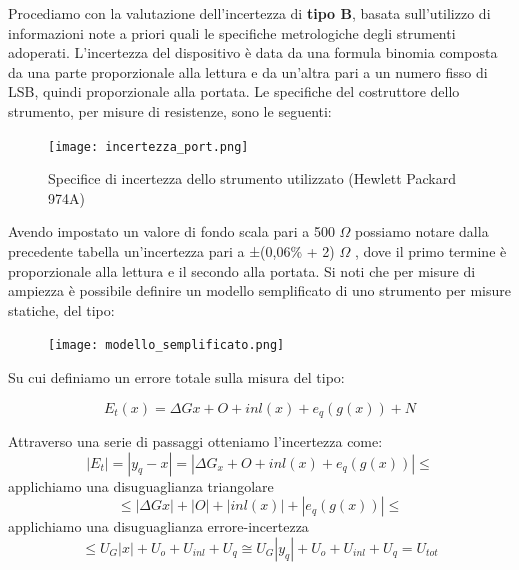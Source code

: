 Procediamo con la valutazione dell'incertezza di \textbf{tipo B}, basata sull'utilizzo di informazioni note a priori quali le specifiche metrologiche degli strumenti adoperati. L’incertezza del dispositivo è data da una formula binomia composta da una parte proporzionale alla lettura e da un’altra pari a un numero fisso di LSB, quindi 
 proporzionale alla portata. Le specifiche del costruttore dello strumento, per misure di resistenze, sono le seguenti:

\begin{figure}[h]
    \centering
    \texttt{[image: incertezza\_port.png]}
    \caption{Specifice di incertezza dello strumento utilizzato (Hewlett Packard 974A)}
    \label{fig:Incertezza_multimetro_port}
\end{figure}
\FloatBarrier

Avendo impostato un valore di fondo scala pari a 500 $\Omega$ possiamo notare dalla precedente tabella un’incertezza pari a ±(0,06\% + 2) $\Omega$ , dove il primo termine è proporzionale alla lettura e il secondo alla portata. Si noti che per misure di ampiezza è possibile definire un modello semplificato di uno strumento per misure statiche, del tipo:

\begin{figure}[h]
    \centering
    \texttt{[image: modello\_semplificato.png]}
    \label{fig:modello}
\end{figure}
\FloatBarrier

Su cui definiamo un errore totale sulla misura del tipo:

\begin{equation}
    E_t(x) = \Delta Gx + O + inl(x) + e_q(g(x)) + N
\end{equation}


Attraverso una serie di passaggi otteniamo l'incertezza come:
\begin{equation}
    |E_t| = |y_q - x| = | \Delta G_x + O + inl(x) + e_q(g(x)) | \leq 
\end{equation}
applichiamo una disuguaglianza triangolare
\begin{equation*}
    \leq | \Delta Gx | + | O | + | inl(x) | + | e_q(g(x)) | \leq 
\end{equation*}
applichiamo una disuguaglianza errore-incertezza
\begin{equation*}
    \leq U_G|x| + U_o + U_{inl} + U_q \cong U_G|y_q| + U_o + U_{inl} +U_q = U_{tot}
\end{equation*}

